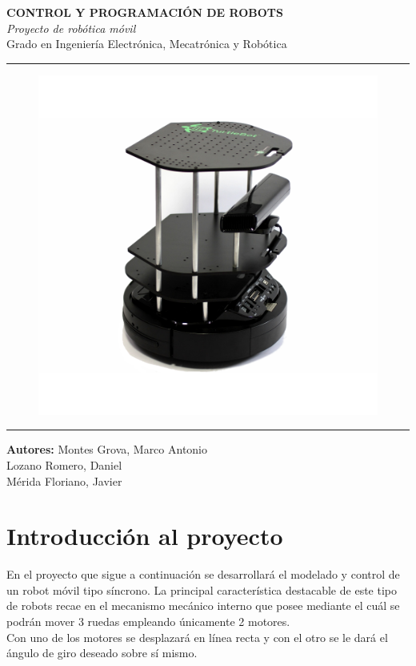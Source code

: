 \documentclass[a4paper,twoside]{article}
\begin{document}
\begin{titlepage}
	\centering
\Huge{\textbf{CONTROL Y PROGRAMACIÓN DE ROBOTS}} \\
\Huge{\textit{Proyecto de robótica móvil}}\\

\vspace{1cm}
\LARGE{Grado en Ingeniería Electrónica, Mecatrónica y Robótica}\\
\rule{\textwidth}{0.1mm}
\begin{figure}[h!]
	\centering
	\includegraphics[width=.7\textwidth]{robot_portada}
\end{figure}
\vspace{1cm}
\rule{\textwidth}{0.1mm}
\Large{\textbf{Autores:} Montes Grova, Marco Antonio\\
 Lozano Romero, Daniel\\
 Mérida Floriano, Javier}
\end{titlepage}
\tableofcontents
\newpage
\section{Introducción al proyecto}
En el proyecto que sigue a continuación se desarrollará el modelado y control de un robot móvil tipo síncrono. La principal característica destacable de este tipo de robots recae en el mecanismo mecánico interno que posee mediante el cuál se podrán mover 3 ruedas empleando únicamente 2 motores.\\
Con uno de los motores se desplazará en línea recta y con el otro se le dará el ángulo de giro deseado sobre sí mismo.\\
\end{document}
